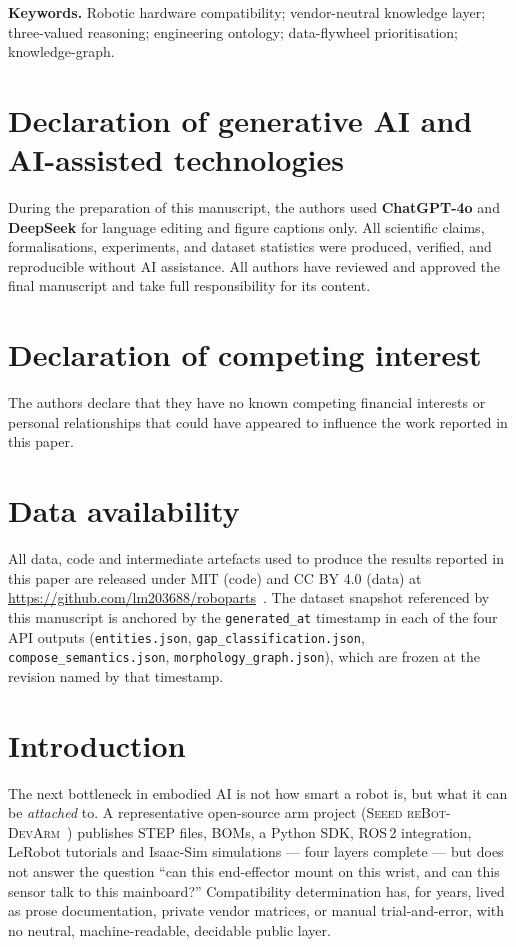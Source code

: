 \documentclass[11pt,twocolumn]{article}
\begin{document}
\noindent\textbf{Keywords.}
Robotic hardware compatibility; vendor-neutral knowledge layer;
three-valued reasoning; engineering ontology;
data-flywheel prioritisation; knowledge-graph.

\section*{Declaration of generative AI and AI-assisted technologies}
\small
During the preparation of this manuscript, the authors used
\textbf{ChatGPT-4o} and \textbf{DeepSeek} for language editing and
figure captions only. All scientific claims, formalisations,
experiments, and dataset statistics were produced, verified, and
reproducible without AI assistance. All authors have reviewed and
approved the final manuscript and take full responsibility for
its content.

\section*{Declaration of competing interest}
The authors declare that they have no known competing financial
interests or personal relationships that could have appeared to
influence the work reported in this paper.

\section*{Data availability}
All data, code and intermediate artefacts used to produce the results
reported in this paper are released under MIT (code) and CC BY 4.0
(data) at \url{https://github.com/lm203688/roboparts}~\cite{roboparts-repo}. The dataset
snapshot referenced by this manuscript is anchored by the
\texttt{generated\_at} timestamp in each of the four API outputs
(\texttt{entities.json}, \texttt{gap\_classification.json},
\texttt{compose\_semantics.json}, \texttt{morphology\_graph.json}),
which are frozen at the revision named by that timestamp.

\section{Introduction}

The next bottleneck in embodied AI is not how smart a robot is, but
what it can be \emph{attached} to. A representative open-source arm
project (\textsc{Seeed reBot-DevArm}~\cite{R14}) publishes STEP files,
BOMs, a Python SDK, ROS\,2 integration, LeRobot tutorials and Isaac-Sim
simulations — four layers complete — but does not answer the question
``can this end-effector mount on this wrist, and can this sensor talk
to this mainboard?'' Compatibility determination has, for years,
lived as prose documentation, private vendor matrices, or manual
trial-and-error, with no neutral, machine-readable, decidable public
layer.
\end{document}
